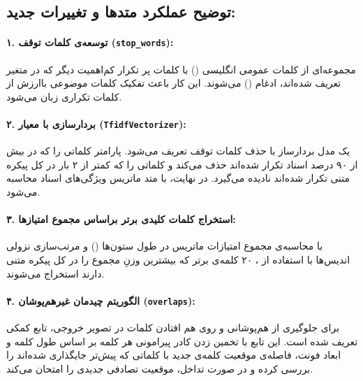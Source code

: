 \documentclass{article}
\begin{document}
    \subsection*{توضیح عملکرد متدها و تغییرات جدید:}

    \paragraph{۱. توسعه‌ی کلمات توقف (\texttt{stop\_words}):}\hspace{-10pt}
    مجموعه‌ای از کلمات عمومی انگلیسی () با کلمات پر تکرار کم‌اهمیت دیگر که در متغیر  تعریف شده‌اند، ادغام () می‌شوند. این کار باعث تفکیک کلمات موضوعی باارزش از کلمات تکراری زبان می‌شود.

    \paragraph{۲. بردارسازی با معیار  (\texttt{TfidfVectorizer}):}\hspace{-10pt}
    یک مدل بردارساز با حذف کلمات توقف تعریف می‌شود. پارامتر  کلماتی را که در بیش از ۹۰ درصد اسناد تکرار شده‌اند حذف می‌کند و  کلماتی را که کمتر از ۲ بار در کل پیکره متنی تکرار شده‌اند نادیده می‌گیرد. در نهایت، با متد  ماتریس ویژگی‌های اسناد محاسبه می‌شود.

    \paragraph{۳. استخراج کلمات کلیدی برتر براساس مجموع امتیازها:}\hspace{-10pt}
    با محاسبه‌ی مجموع امتیازات ماتریس در طول ستون‌ها () و مرتب‌سازی نزولی اندیس‌ها با استفاده از ، ۲۰ کلمه‌ی برتر که بیشترین وزنِ مجموع را در کل پیکره متنی دارند استخراج می‌شوند.

    \paragraph{۴. الگوریتم چیدمان غیرهم‌پوشان (\texttt{overlaps}):}\hspace{-10pt}
    برای جلوگیری از هم‌پوشانی و روی هم افتادن کلمات در تصویر خروجی، تابع کمکی  تعریف شده است. این تابع با تخمین زدن کادر پیرامونی هر کلمه بر اساس طول کلمه و ابعاد فونت، فاصله‌ی موقعیت کلمه‌ی جدید با کلماتی که پیش‌تر جایگذاری شده‌اند را بررسی کرده و در صورت تداخل، موقعیت تصادفی جدیدی را امتحان می‌کند.
\end{document}
